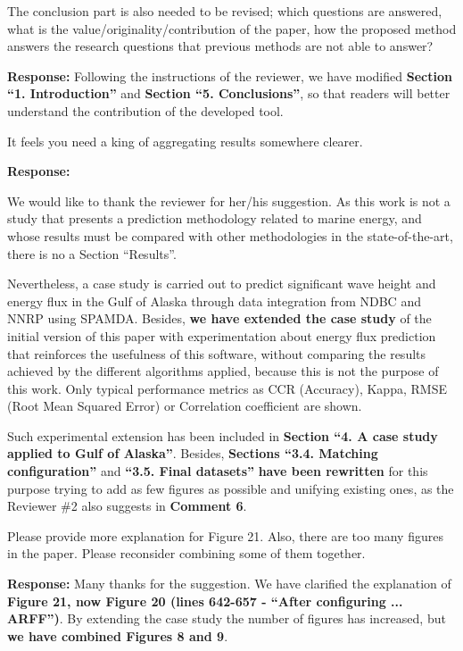 \documentclass[a4paper,twoside,11pt]{article}
\newcounter{comments}[section]
\newcommand{\rcomment}[1]
{
	\stepcounter{comments}
	\vspace{0.6cm}
	\begin{tcolorbox}[colback=black!5,colframe=white!45!black,title=Comment \arabic{comments}]
		#1
	\end{tcolorbox}
}
\begin{document}
\newpage

\rcomment
{
The conclusion part is also needed to be revised; which questions are answered, what is the value/originality/contribution of the paper, how the proposed method answers the research questions that previous methods are not able to answer?
}

\textbf{Response:}
{
Following the instructions of the reviewer, we have modified \textbf{Section ``1. Introduction''} and   \textbf{Section ``5. Conclusions''}, so that readers will better understand the contribution of the developed tool.
}

\rcomment
{
It feels you need a king of aggregating results somewhere clearer.

}

\textbf{Response:}
{
We would like to thank the reviewer for her/his suggestion. As this work is not a study that presents a prediction methodology related to marine energy, and whose results must be compared with other methodologies in the state-of-the-art, there is no a Section ``Results''. 

Nevertheless, a case study is carried out to predict significant wave height and energy flux in the Gulf of Alaska through data integration from NDBC and NNRP using SPAMDA. Besides, \textbf{we have extended the case study} of the initial version of this paper with experimentation about energy flux prediction that reinforces the usefulness of this software, without comparing the results achieved by the different algorithms applied, because this is not the purpose of this work. Only typical performance metrics as CCR (Accuracy), Kappa, RMSE (Root Mean Squared Error) or Correlation coefficient are shown.

Such experimental extension has been included in \textbf{Section ``4. A case study applied to Gulf of Alaska''}. Besides, \textbf{Sections ``3.4. Matching configuration''} and \textbf{``3.5. Final datasets''} \textbf{have been rewritten} for this purpose trying to add as few figures as possible and unifying existing ones, as the Reviewer \#2 also suggests in \textbf{Comment 6}.
}





\rcomment
{
Please provide more explanation for Figure 21. Also, there are too many figures in the paper. Please reconsider combining some of them together.

}
\textbf{Response:}
{
Many thanks for the suggestion. We have clarified the explanation of \textbf{Figure 21, now Figure 20  (lines 642-657 - ``After configuring ... ARFF'')}. By extending the case study the number of figures has increased, but \textbf{we have combined Figures 8 and 9}.
}
\end{document}
